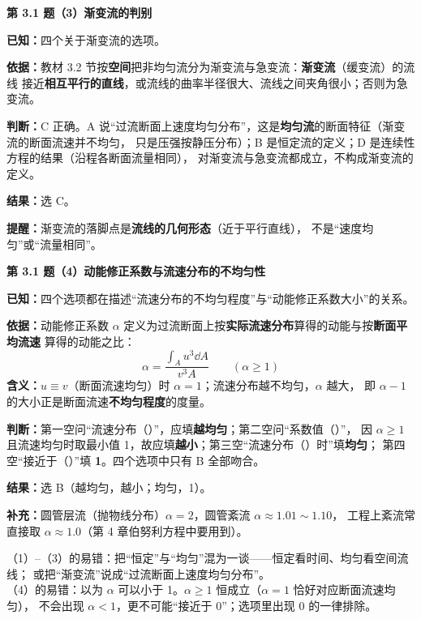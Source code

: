 \noindent\textbf{第 3.1 题（3）\quad 渐变流的判别}

\begin{jie}
\textbf{已知：}四个关于渐变流的选项。

\textbf{依据：}教材 3.2 节按\textbf{空间}把非均匀流分为渐变流与急变流：\textbf{渐变流}（缓变流）的流线
接近\textbf{相互平行的直线}，或流线的曲率半径很大、流线之间夹角很小；否则为急变流。

\textbf{判断：}C 正确。A 说“过流断面上速度均匀分布”，这是\textbf{均匀流}的断面特征（渐变流的断面流速并不均匀，
只是压强按静压分布）；B 是恒定流的定义；D 是连续性方程的结果（沿程各断面流量相同），
对渐变流与急变流都成立，不构成渐变流的定义。

\textbf{结果：}选 C。

\textbf{提醒：}渐变流的落脚点是\textbf{流线的几何形态}（近于平行直线），
不是“速度均匀”或“流量相同”。
\end{jie}

\noindent\textbf{第 3.1 题（4）\quad 动能修正系数与流速分布的不均匀性}

\begin{jie}
\textbf{已知：}四个选项都在描述“流速分布的不均匀程度”与“动能修正系数大小”的关系。

\textbf{依据：}动能修正系数 $\alpha$ 定义为过流断面上按\textbf{实际流速分布}算得的动能与按\textbf{断面平均流速}
算得的动能之比：
\[ \alpha=\frac{\displaystyle\int_A u^3\dd A}{v^3A}\qquad(\alpha\ge1) \]
\textbf{含义：}$u\equiv v$（断面流速均匀）时 $\alpha=1$；流速分布越不均匀，$\alpha$ 越大，
即 $\alpha-1$ 的大小正是断面流速\textbf{不均匀程度}的度量。

\textbf{判断：}第一空问“流速分布（\quad）”，应填\textbf{越均匀}；第二空问“系数值（\quad）”，
因 $\alpha\ge1$ 且流速均匀时取最小值 1，故应填\textbf{越小}；第三空“流速分布（\quad）时”填\textbf{均匀}；
第四空“接近于（\quad）”填 \textbf{1}。四个选项中只有 B 全部吻合。

\textbf{结果：}选 B（越均匀，越小；均匀，1）。

\textbf{补充：}圆管层流（抛物线分布）$\alpha=2$，圆管紊流 $\alpha\approx1.01\sim1.10$，
工程上紊流常直接取 $\alpha\approx1.0$（第 4 章伯努利方程中要用到）。
\end{jie}

\begin{yicuo}
（1）--（3）的易错：把“恒定”与“均匀”混为一谈——恒定看时间、均匀看空间流线；
或把“渐变流”说成“过流断面上速度均匀分布”。\\
（4）的易错：以为 $\alpha$ 可以小于 1。$\alpha\ge1$ 恒成立（$\alpha=1$ 恰好对应断面流速均匀），
不会出现 $\alpha<1$，更不可能“接近于 0”；选项里出现 0 的一律排除。
\end{yicuo}

